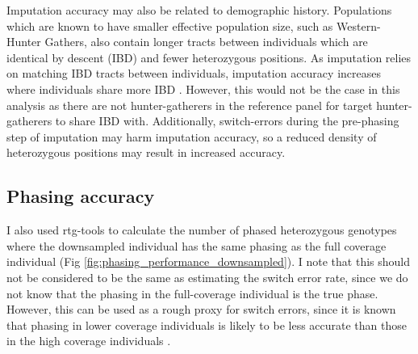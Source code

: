 {Imputation accuracy may also be related to demographic history. Populations which are known to have smaller effective population size, such as Western-Hunter Gathers, also contain longer tracts between individuals which are identical by descent (IBD) \cite{browning2015accurate} and fewer heterozygous positions. As imputation relies on matching IBD tracts between individuals, imputation accuracy increases where individuals share more IBD \cite{kong2008detection}. However, this would not be the case in this analysis as there are not hunter-gatherers in the reference panel for target hunter-gatherers to share IBD with. Additionally, switch-errors during the pre-phasing step of imputation may harm imputation accuracy, so a reduced density of heterozygous positions may result in increased accuracy. 

\subsection{Phasing accuracy}

I also used rtg-tools to calculate the number of phased heterozygous genotypes where the downsampled individual has the same phasing as the full coverage individual (Fig \ref{fig:phasing_performance_downsampled}). I note that this should not be considered to be the same as estimating the switch error rate, since we do not know that the phasing in the full-coverage individual is the true phase. However, this can be used as a rough proxy for switch errors, since it is known that phasing in lower coverage individuals is likely to be less accurate than those in the high coverage individuals \cite{rubinacci2021efficient}.

}
